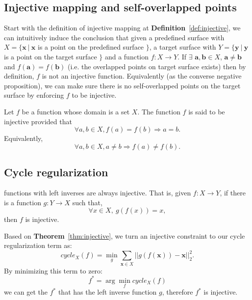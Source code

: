 \subsection{Injective mapping and self-overlapped points}
\label{subsec:inj}
Start with the definition of injective mapping at \textbf{Definition}~\ref{def:injective}, we can intuitively induce the conclusion that given a predefined surface with $ X =\{\mathbf{x}~|~\mathbf{x}$ is a point on the predefined surface $ \} $, a target surface with $ Y =\{\mathbf{y}~|~\mathbf{y}$ is a point on the target surface $ \} $ and a function $f:X \rightarrow Y$. If $\exists$ $ \mathbf{a},\mathbf{b} \in X$, $\mathbf{a} \neq \mathbf{b}$ and $f(\mathbf{a}) = f(\mathbf{b})$ (i.e. the overlapped points on target surface exists) then by definition, $f$ is not an injective function. Equivalently (as the converse negative proposition), we can make sure there is no self-overlapped points on the target surface by enforcing $f$ to be injective.
\begin{m_def}
\label{def:injective}
Let $f$ be a function whose domain is a set $X$. The function $f$ is said to be injective provided that
\begin{equation}
\forall a,b \in X, f(a) = f(b) \Rightarrow a = b.
\end{equation}
Equivalently, 
\begin{equation}
\forall a,b \in X, a \neq b \Rightarrow f(a) \neq f(b).
\end{equation}
\end{m_def}

\subsection{Cycle regularization}
\label{subsec:cyclereg}
\begin{m_thm}
\label{thm:injective}
functions with left inverses are always injective. That is, given $f:X \rightarrow Y$, if there is a function $g:Y \rightarrow X$ such that,
\begin{equation}
\label{equ:injective}
\forall x \in X,~g(f(x)) = x,
\end{equation}
then $f$ is injective.
\end{m_thm}

Based on \textbf{Theorem}~\ref{thm:injective}, we turn an injective constraint to our cycle regularization term as:
\begin{equation}
\label{equ:cycle_term}
cycle_X(f)=\min_g\sum_{\mathbf{x}\in X}||g(f(\mathbf{x})) - \mathbf{x}||_2^2.
\end{equation}
By minimizing this term to zero:
\begin{equation}
f^* = \arg\min_f cycle_X(f)
\end{equation}
we can get the $f^*$ that has the left inverse function $g$, therefore $f^*$ is injective. 

